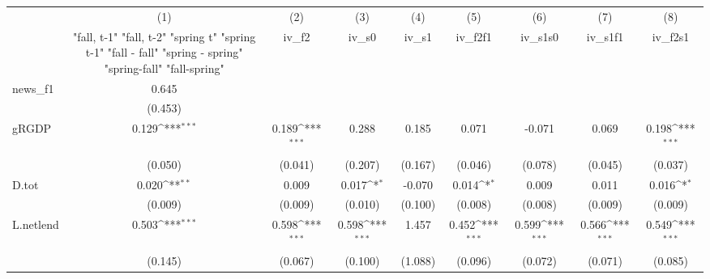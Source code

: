 {
\def\sym#1{\ifmmode^{#1}\else\(^{#1}\)\fi}
\begin{tabular}{l*{8}{c}}
\toprule
            &\multicolumn{1}{c}{(1)}&\multicolumn{1}{c}{(2)}&\multicolumn{1}{c}{(3)}&\multicolumn{1}{c}{(4)}&\multicolumn{1}{c}{(5)}&\multicolumn{1}{c}{(6)}&\multicolumn{1}{c}{(7)}&\multicolumn{1}{c}{(8)}\\
            &\multicolumn{1}{c}{  "fall, t-1" "fall, t-2" "spring t" "spring t-1"  "fall - fall" "spring - spring" "spring-fall" "fall-spring" }&\multicolumn{1}{c}{iv\_f2}&\multicolumn{1}{c}{iv\_s0}&\multicolumn{1}{c}{iv\_s1}&\multicolumn{1}{c}{iv\_f2f1}&\multicolumn{1}{c}{iv\_s1s0}&\multicolumn{1}{c}{iv\_s1f1}&\multicolumn{1}{c}{iv\_f2s1}\\
\midrule
news\_f1     &       0.645         &                     &                     &                     &                     &                     &                     &                     \\
            &     (0.453)         &                     &                     &                     &                     &                     &                     &                     \\
\addlinespace
gRGDP       &       0.129\sym{***}&       0.189\sym{***}&       0.288         &       0.185         &       0.071         &      -0.071         &       0.069         &       0.198\sym{***}\\
            &     (0.050)         &     (0.041)         &     (0.207)         &     (0.167)         &     (0.046)         &     (0.078)         &     (0.045)         &     (0.037)         \\
\addlinespace
D.tot       &       0.020\sym{**} &       0.009         &       0.017\sym{*}  &      -0.070         &       0.014\sym{*}  &       0.009         &       0.011         &       0.016\sym{*}  \\
            &     (0.009)         &     (0.009)         &     (0.010)         &     (0.100)         &     (0.008)         &     (0.008)         &     (0.009)         &     (0.009)         \\
\addlinespace
L.netlend   &       0.503\sym{***}&       0.598\sym{***}&       0.598\sym{***}&       1.457         &       0.452\sym{***}&       0.599\sym{***}&       0.566\sym{***}&       0.549\sym{***}\\
            &     (0.145)         &     (0.067)         &     (0.100)         &     (1.088)         &     (0.096)         &     (0.072)         &     (0.071)         &     (0.085)         \\

\end{tabular}}
